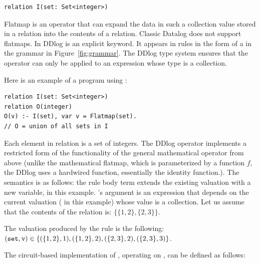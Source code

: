 \begin{lstlisting}[language=ddlog]
relation I(set: Set<integer>)
\end{lstlisting}

Flatmap is an operator that can expand the data in such a collection value
stored in a relation into the contents of a relation.  Classic Datalog does not support flatmaps.
In DDlog  is an explicit keyword.  It appears
in rules in the form of a  in
the grammar in Figure~\ref{fig:grammar}.  The DDlog type system ensures that the 
operator can only be applied to an expression whose type is a collection.

Here is an example of a program using :

\begin{lstlisting}[language=ddlog]
relation I(set: Set<integer>)
relation O(integer)
O(v) :- I(set), var v = Flatmap(set).
// O = union of all sets in I
\end{lstlisting}

Each element in relation  is a set of integers.
The DDlog  operator implements a restricted form of
the functionality of the general mathematical operator from above
(unlike the mathematical flatmap, which is parameterized by a function $f$, the DDlog
 uses a hardwired function, essentially the identity function.).
The semantics is as follows: the  rule body term extends the existing valuation
with a new variable,  in this example.  's argument is
an expression that depends on the current valuation ( in this example)
whose value is a collection.  Let us assume that the contents of the  relation is:
$\{ \{1,2\}, \{2,3\} \}$.

The valuation produced by the rule  is
the following: $(\mbox{\texttt{set}}, \mbox{\texttt{v}}) \in  \{ (\{1,2\}, 1), (\{1,2\}, 2),
(\{2,3\}, 2), (\{2,3\}, 3) \}$.

The circuit-based implementation of , operating on \zrs, can be
defined as follows:


